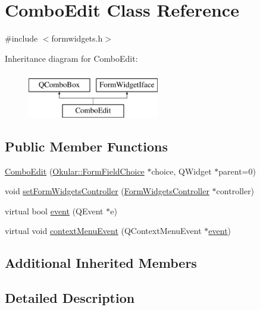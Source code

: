 \hypertarget{classComboEdit}{\section{Combo\+Edit Class Reference}
\label{classComboEdit}
}


{\ttfamily \#include $<$formwidgets.\+h$>$}

Inheritance diagram for Combo\+Edit\+:\begin{figure}[H]
\begin{center}
\leavevmode
\includegraphics[height=2.000000cm]{classComboEdit}
\end{center}
\end{figure}
\subsection*{Public Member Functions}
\begin{DoxyCompactItemize}
\item 
\hyperlink{classComboEdit_ad24134a1514abb6eaa645822883c93a4}{Combo\+Edit} (\hyperlink{classOkular_1_1FormFieldChoice}{Okular\+::\+Form\+Field\+Choice} $\ast$choice, Q\+Widget $\ast$parent=0)
\item 
void \hyperlink{classComboEdit_a36fc02dbfb94f988dede11d57390d138}{set\+Form\+Widgets\+Controller} (\hyperlink{classFormWidgetsController}{Form\+Widgets\+Controller} $\ast$controller)
\item 
virtual bool \hyperlink{classComboEdit_abedca59cf3b7a7cf894e8ab3c6d657e1}{event} (Q\+Event $\ast$e)
\item 
virtual void \hyperlink{classComboEdit_af5bebe6b5c7266399c66a43a57f48997}{context\+Menu\+Event} (Q\+Context\+Menu\+Event $\ast$\hyperlink{classComboEdit_abedca59cf3b7a7cf894e8ab3c6d657e1}{event})
\end{DoxyCompactItemize}
\subsection*{Additional Inherited Members}


\subsection{Detailed Description}


